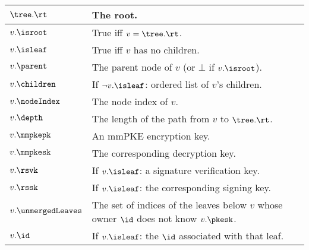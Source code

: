 \begin{table*}[!t]
  \begin{minipage}[t]{.48\textwidth}
  	\begin{tabularx}{\textwidth}{| l | X |}
      \hline
    	$\tree.\rt$ & The root.\\
    	\hline
    	$v.\isroot$ & True iff $v = \tree.\rt$.\\
    	\hline
    	$v.\isleaf$ & True iff $v$ has no children.\\
    	\hline
    	$v.\parent$ & The parent node of $v$ (or $\bot$ if $v.\isroot$).\\
    	\hline
    	$v.\children$ & If $\neg v.\isleaf$: ordered list of $v$'s children.\\
    	\hline
    	$v.\nodeIndex$ & The node index of $v$.\\
      \hline
      $v.\depth$ & The length of the path from $v$ to $\tree.\rt$. \\
  		\hline
  		$v.\mmpkepk$ & An mmPKE encryption key.\\
  		\hline
  		$v.\mmpkesk$ & The corresponding decryption key.\\
  		\hline
      $v.\rsvk$ & If $v.\isleaf$: a signature verification key.\\
  		\hline
      $v.\rssk$ & If $v.\isleaf$: the corresponding signing key.\\
  		\hline
  		$v.\unmergedLeaves$ & The set of indices of the leaves below $v$ whose owner $\id$ does not know $v.\pkesk$.\\
  		\hline
  		$v.\id$ & If $v.\isleaf$: the $\id$ associated with that leaf.\\
  		\hline
  	\end{tabularx}


\end{minipage}
\end{table*}
